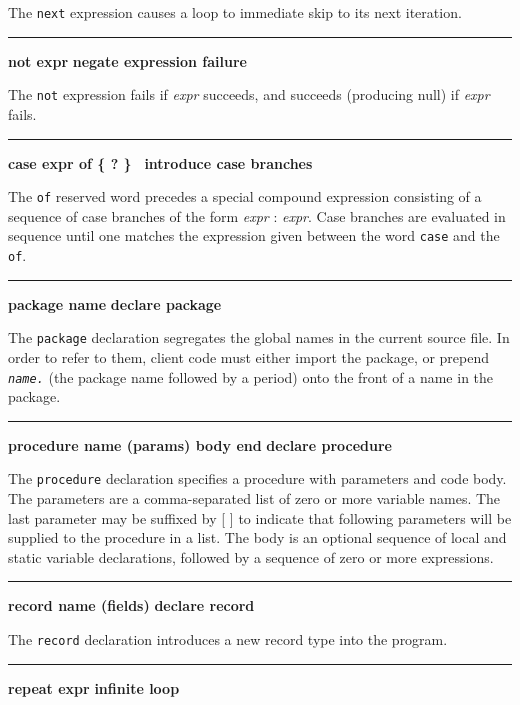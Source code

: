 \noindent
{}The \texttt{next} expression causes a loop to
immediate skip to its next iteration.

\bigskip\hrule\vspace{0.1cm}
\noindent
{\bf not expr } \hfill {\bf negate expression failure}

\noindent
{}The \texttt{not} expression fails if \textit{expr} succeeds,
and succeeds (producing null) if \textit{expr} fails.

\bigskip\hrule\vspace{0.1cm}
\noindent
{\bf case expr of \{ ? \}\ } \hfill {\bf introduce case branches}

\noindent
{}The \texttt{of} reserved word precedes a special compound
expression consisting of a sequence of case branches of the form
\textit{expr} : \textit{expr}. Case branches are evaluated in sequence
until one matches the expression given between the word
\texttt{case} and the \texttt{of}.

\bigskip\hrule\vspace{0.1cm}
\noindent
{\bf package name } \hfill {\bf declare package}

\noindent
{}The \texttt{package} declaration segregates the global
names in the current source file. In order to refer to them, client
code must either import the package, or prepend
\texttt{\textit{name.}} (the package name followed by a period)
onto the front of a name in the package.

\bigskip\hrule\vspace{0.1cm}
\noindent
{\bf procedure name (params) body end } \hfill {\bf declare procedure}

\noindent
{}The \texttt{procedure} declaration specifies a
procedure with parameters and code body. The parameters
are a comma-separated list of zero or more variable names. The last
parameter may be suffixed by [ ] to indicate that
following parameters will be supplied to the procedure in a list. The
body is an optional sequence of local and static variable declarations,
followed by a sequence of zero or more expressions.

\bigskip\hrule\vspace{0.1cm}
\noindent
{\bf record name (fields) } \hfill {\bf declare record}

\noindent
{}The \texttt{record} declaration introduces a new record
type into the program.

\bigskip\hrule\vspace{0.1cm}
\noindent
{\bf repeat expr } \hfill {\bf infinite loop}

